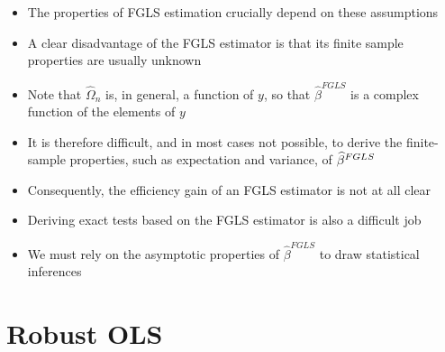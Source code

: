 \documentclass[notes=show]{beamer}
\begin{document}
\begin{frame}%


\begin{itemize}
\item The properties of FGLS estimation crucially depend on these assumptions

\item A clear disadvantage of the FGLS estimator is that its finite sample
properties are usually unknown

\item Note that $\widehat{\Omega }_{n}$ is, in general, a function of $y$,
so that $\widehat{\beta }^{FGLS}$ is a complex function of the elements of $%
y $

\item It is therefore difficult, and in most cases not possible, to derive
the finite-sample properties, such as expectation and variance, of $\widehat{%
\beta }^{FGLS}$

\item Consequently, the efficiency gain of an FGLS estimator is not at all
clear

\item Deriving exact tests based on the FGLS estimator is also a difficult
job

\item We must rely on the asymptotic properties of $\widehat{\beta }^{FGLS}$
to draw statistical inferences
\end{itemize}

\end{frame}%

\section{Robust OLS}
\end{document}
